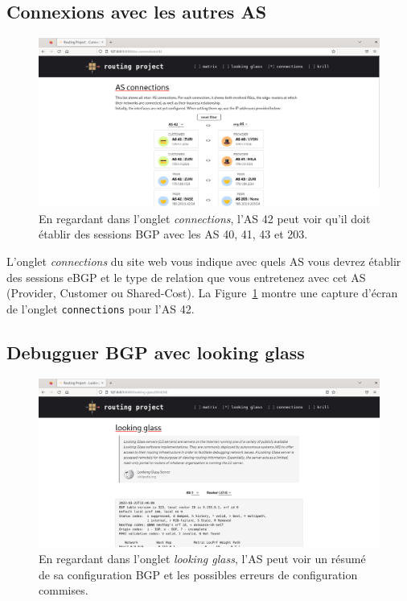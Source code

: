 \documentclass[a4paper, 11pt]{article}
\begin{document}
\subsection{Connexions avec les autres AS}

\begin{figure}
    \centering
    \includegraphics[width=0.8\linewidth]{figures/as-connections-screenshot.png}
    \caption{En regardant dans l'onglet \textit{connections}, l'AS 42 peut voir
    qu'il doit établir des sessions BGP avec les AS 40, 41, 43 et 203.}
    \label{fig:as-connections-screenshot}
\end{figure}

L'onglet \textit{connections} du site web vous indique avec quels AS vous
devrez établir des sessions eBGP et le type de relation que vous entretenez
avec cet AS (Provider, Customer ou Shared-Cost). La
Figure~\ref{fig:as-connections-screenshot} montre une capture d'écran de l'onglet
\texttt{connections} pour l'AS 42.

\subsection{Debugguer BGP avec looking glass}

\begin{figure}
    \centering
    \includegraphics[width=0.8\linewidth]{figures/looking-glass-screenshot.png}
    \caption{En regardant dans l'onglet \textit{looking glass}, l'AS peut voir
    un résumé de sa configuration BGP et les possibles erreurs de configuration
    commises.}
    \label{fig:looking-glass-screenshot}
\end{figure}
\end{document}

